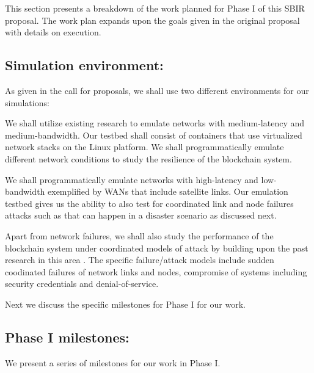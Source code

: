 \label{sec:plan}
This section presents a breakdown of the work planned for Phase I of this SBIR proposal. The work plan expands upon the
goals given in the original proposal with details on execution. 

\subsection{Simulation environment:}

As given in the call for proposals, we shall use two different environments for our simulations:

 We shall utilize existing research \cite{gustaf2013, haq2017}
to emulate networks with medium-latency and medium-bandwidth. Our testbed shall consist of 
containers that use virtualized network stacks on the Linux platform. We shall programmatically
emulate different network conditions to study the resilience of the blockchain system.

  We shall programmatically emulate networks with high-latency and low-bandwidth
exemplified by WANs that include satellite links. Our emulation testbed gives us the ability to also test for
coordinated link and node failures attacks such as that can happen in a disaster scenario as discussed next.
 
 Apart from network failures, we shall also study the performance of the blockchain
system under coordinated models of attack by building upon the past research in this area \cite{xiao2006, niu2017,
kurar2014, zhou2010}. The specific failure/attack models include sudden coodinated failures of network links and nodes,
compromise of systems including security credentials and denial-of-service.

Next we discuss the specific milestones for Phase I for our work. 
\subsection{Phase I milestones:}

We present a series of milestones for our work in Phase I. 

